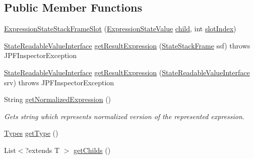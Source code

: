 \subsection*{Public Member Functions}
\begin{DoxyCompactItemize}
\item 
\hyperlink{classgov_1_1nasa_1_1jpf_1_1inspector_1_1server_1_1expression_1_1expressions_1_1_expression_state_stack_frame_slot_a14a83872f0a7fbaab1c6b1355274bc19}{Expression\+State\+Stack\+Frame\+Slot} (\hyperlink{classgov_1_1nasa_1_1jpf_1_1inspector_1_1server_1_1expression_1_1expressions_1_1_expression_state_value}{Expression\+State\+Value} \hyperlink{classgov_1_1nasa_1_1jpf_1_1inspector_1_1server_1_1expression_1_1_expression_state_unary_operator_a66041b1f569a361549e28a00f7ca5f2f}{child}, int \hyperlink{classgov_1_1nasa_1_1jpf_1_1inspector_1_1server_1_1expression_1_1expressions_1_1_expression_state_stack_frame_slot_ad943f10c022780efc661c1b961fdfd77}{slot\+Index})
\item 
\hyperlink{interfacegov_1_1nasa_1_1jpf_1_1inspector_1_1server_1_1programstate_1_1_state_readable_value_interface}{State\+Readable\+Value\+Interface} \hyperlink{classgov_1_1nasa_1_1jpf_1_1inspector_1_1server_1_1expression_1_1expressions_1_1_expression_state_stack_frame_slot_a663e100fc7fcf7b4d1b6d1fac56100f4}{get\+Result\+Expression} (\hyperlink{classgov_1_1nasa_1_1jpf_1_1inspector_1_1server_1_1programstate_1_1_state_stack_frame}{State\+Stack\+Frame} ssf)  throws J\+P\+F\+Inspector\+Exception 
\item 
\hyperlink{interfacegov_1_1nasa_1_1jpf_1_1inspector_1_1server_1_1programstate_1_1_state_readable_value_interface}{State\+Readable\+Value\+Interface} \hyperlink{classgov_1_1nasa_1_1jpf_1_1inspector_1_1server_1_1expression_1_1expressions_1_1_expression_state_stack_frame_slot_a570a23ecccf7239b7210ff65eba4d8d1}{get\+Result\+Expression} (\hyperlink{interfacegov_1_1nasa_1_1jpf_1_1inspector_1_1server_1_1programstate_1_1_state_readable_value_interface}{State\+Readable\+Value\+Interface} srv)  throws J\+P\+F\+Inspector\+Exception 
\item 
String \hyperlink{classgov_1_1nasa_1_1jpf_1_1inspector_1_1server_1_1expression_1_1expressions_1_1_expression_state_stack_frame_slot_a4f04945cb68f2ad02d3fe8db36179f1f}{get\+Normalized\+Expression} ()
\begin{DoxyCompactList}\small\item\em Gets string which represents normalized version of the represented expression. \end{DoxyCompactList}\item 
\hyperlink{enumgov_1_1nasa_1_1jpf_1_1inspector_1_1server_1_1expression_1_1_types}{Types} \hyperlink{classgov_1_1nasa_1_1jpf_1_1inspector_1_1server_1_1expression_1_1expressions_1_1_expression_state_value_a9317f49f60c166a2f46f90702e75f22e}{get\+Type} ()
\item 
List$<$?extends T $>$ \hyperlink{classgov_1_1nasa_1_1jpf_1_1inspector_1_1server_1_1expression_1_1_expression_state_unary_operator_ad010bcb9c4e2eb584321b5ceba8e1682}{get\+Childs} ()
\end{DoxyCompactItemize}

